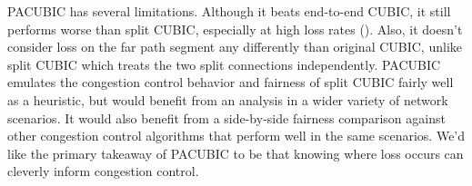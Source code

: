 PACUBIC has several limitations. Although it beats end-to-end CUBIC, it
still performs worse than split CUBIC, especially at
high loss rates (). Also, it doesn't consider loss on the
far path segment any differently than original CUBIC, unlike split CUBIC
which treats the two split connections independently. PACUBIC
emulates the congestion control behavior and fairness of split CUBIC
fairly well as a heuristic, but would benefit from an analysis in a
wider variety of network scenarios. It would also benefit from a side-by-side
fairness comparison against other congestion control algorithms that perform
well in the same scenarios. We'd like the primary takeaway of PACUBIC to be
that knowing where loss occurs can cleverly inform congestion control.
